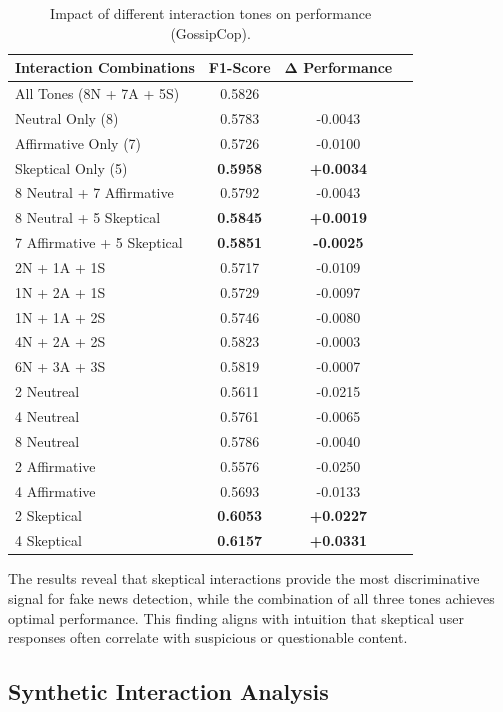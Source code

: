 \begin{table}[htbp]
\centering
\caption{Impact of different interaction tones on performance (GossipCop).}
\label{tab:ablation_tones_gossipcop}
\begin{tabular}{lccc}
\toprule
\textbf{Interaction Combinations} & \textbf{F1-Score} & \textbf{Δ Performance} \\
\midrule
All Tones (8N + 7A + 5S) & 0.5826 & \- \\
\midrule
Neutral Only (8) & 0.5783 & -0.0043 \\
Affirmative Only (7) & 0.5726 & -0.0100 \\
Skeptical Only (5) & \textbf{0.5958} & \textbf{+0.0034} \\
\midrule
8 Neutral + 7 Affirmative & 0.5792 & -0.0043 \\
8 Neutral + 5 Skeptical & \textbf{0.5845} & \textbf{+0.0019} \\
7 Affirmative + 5 Skeptical & \textbf{0.5851} & \textbf{-0.0025} \\
\midrule
2N + 1A + 1S & 0.5717 & -0.0109 \\
1N + 2A + 1S & 0.5729 & -0.0097 \\
1N + 1A + 2S & 0.5746 & -0.0080 \\
\midrule
4N + 2A + 2S & 0.5823 & -0.0003 \\
6N + 3A + 3S & 0.5819 & -0.0007 \\
\midrule
2 Neutreal & 0.5611 & -0.0215 \\
4 Neutreal & 0.5761 & -0.0065 \\
8 Neutreal & 0.5786 & -0.0040 \\ 
2 Affirmative & 0.5576 & -0.0250 \\
4 Affirmative & 0.5693 & -0.0133 \\
2 Skeptical & \textbf{0.6053} & \textbf{+0.0227} \\
4 Skeptical & \textbf{0.6157} & \textbf{+0.0331} \\
\bottomrule
\end{tabular}
\end{table}

The results reveal that skeptical interactions provide the most discriminative signal for fake news detection, while the combination of all three tones achieves optimal performance. This finding aligns with intuition that skeptical user responses often correlate with suspicious or questionable content.

\subsection{Synthetic Interaction Analysis}

